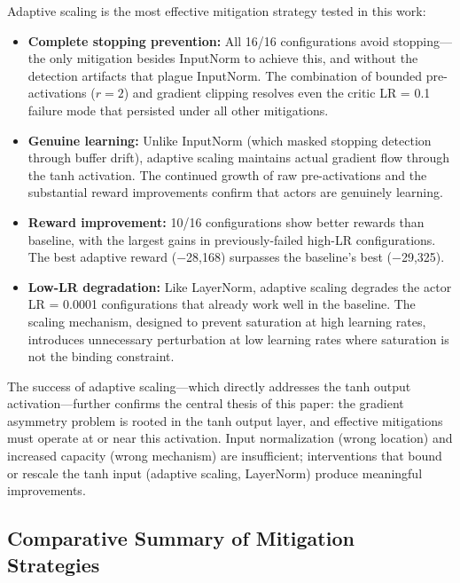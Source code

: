 Adaptive scaling is the most effective mitigation strategy tested in this work:
\begin{itemize}
    \item \textbf{Complete stopping prevention:} All 16/16 configurations avoid stopping---the only mitigation besides InputNorm to achieve this, and without the detection artifacts that plague InputNorm. The combination of bounded pre-activations ($r = 2$) and gradient clipping resolves even the critic LR = 0.1 failure mode that persisted under all other mitigations.

    \item \textbf{Genuine learning:} Unlike InputNorm (which masked stopping detection through buffer drift), adaptive scaling maintains actual gradient flow through the tanh activation. The continued growth of raw pre-activations and the substantial reward improvements confirm that actors are genuinely learning.

    \item \textbf{Reward improvement:} 10/16 configurations show better rewards than baseline, with the largest gains in previously-failed high-LR configurations. The best adaptive reward ($-$28,168) surpasses the baseline's best ($-$29,325).

    \item \textbf{Low-LR degradation:} Like LayerNorm, adaptive scaling degrades the actor LR = 0.0001 configurations that already work well in the baseline. The scaling mechanism, designed to prevent saturation at high learning rates, introduces unnecessary perturbation at low learning rates where saturation is not the binding constraint.
\end{itemize}

The success of adaptive scaling---which directly addresses the tanh output activation---further confirms the central thesis of this paper: the gradient asymmetry problem is rooted in the tanh output layer, and effective mitigations must operate at or near this activation. Input normalization (wrong location) and increased capacity (wrong mechanism) are insufficient; interventions that bound or rescale the tanh input (adaptive scaling, LayerNorm) produce meaningful improvements.

\subsection{Comparative Summary of Mitigation Strategies}
\label{subsec:mitigation_summary}

